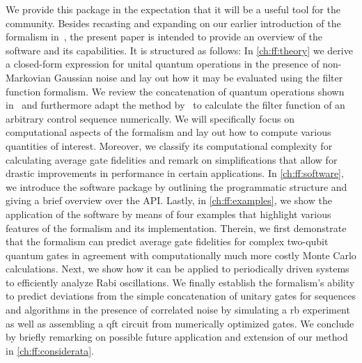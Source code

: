 We provide this package in the expectation that it will be a useful tool for the community.
Besides recasting and expanding on our earlier introduction of the formalism in~, the present paper is intended to provide an overview of the software and its capabilities.
It is structured as follows: In \cref{ch:ff:theory} we derive a closed-form expression for unital quantum operations in the presence of non-Markovian Gaussian noise and lay out how it may be evaluated using the filter function formalism.
We review the concatenation of quantum operations shown in~ and furthermore adapt the method by~\citeauthor{Green2013} to calculate the filter function of an arbitrary control sequence numerically.
We will specifically focus on computational aspects of the formalism and lay out how to compute various quantities of interest.
Moreover, we classify its computational complexity for calculating average gate fidelities and remark on simplifications that allow for drastic improvements in performance in certain applications.
In \cref{ch:ff:software}, we introduce the software package by outlining the programmatic structure and giving a brief overview over the API.
Lastly, in \cref{ch:ff:examples}, we show the application of the software by means of four examples that highlight various features of the formalism and its implementation.
Therein, we first demonstrate that the formalism can predict average gate fidelities for complex two-qubit quantum gates in agreement with computationally much more costly Monte Carlo calculations.
Next, we show how it can be applied to periodically driven systems to efficiently analyze Rabi oscillations.
We finally establish the formalism's ability to predict deviations from the simple concatenation of unitary gates for sequences and algorithms in the presence of correlated noise by simulating a \gls{rb} experiment as well as assembling a \gls{qft} circuit from numerically optimized gates.
We conclude by briefly remarking on possible future application and extension of our method in \cref{ch:ff:considerata}.


